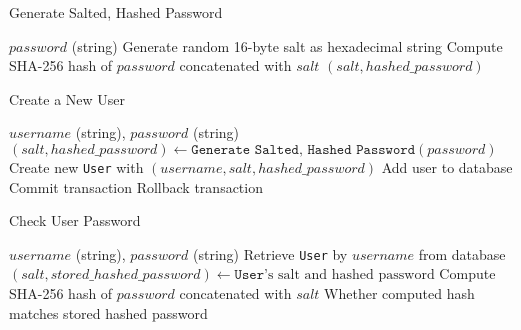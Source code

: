 \begin{algorithm}
\caption{Generate Salted, Hashed Password}
\begin{algorithmic}
\REQUIRE $password$ (string)
\STATE Generate random 16-byte salt as hexadecimal string
\STATE Compute SHA-256 hash of $password$ concatenated with $salt$
\RETURN $(salt, hashed\_password)$
\end{algorithmic}
\end{algorithm}

\begin{algorithm}
\caption{Create a New User}
\begin{algorithmic}
\REQUIRE $username$ (string), $password$ (string)
\STATE $(salt, hashed\_password) \gets \texttt{Generate Salted, Hashed Password}(password)$
\STATE Create new \texttt{User} with $(username, salt, hashed\_password)$
\TRY
    \STATE Add user to database
    \STATE Commit transaction
\EXCEPT
    \STATE Rollback transaction
\ENDTRY
\end{algorithmic}
\end{algorithm}

\begin{algorithm}
\caption{Check User Password}
\begin{algorithmic}
\REQUIRE $username$ (string), $password$ (string)
\STATE Retrieve \texttt{User} by $username$ from database
    \THROW
\ENDIF
\STATE $(salt, stored\_hashed\_password) \gets \texttt{User}\mbox{'s salt and hashed password}$
\STATE Compute SHA-256 hash of $password$ concatenated with $salt$
\RETURN Whether computed hash matches stored hashed password
\end{algorithmic}
\end{algorithm}